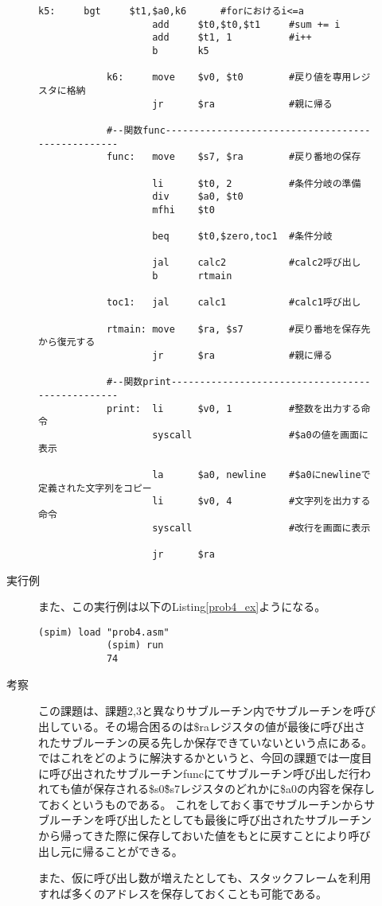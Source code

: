 \documentclass{jsarticle}
\begin{document}
\begin{description}
\begin{description}
\begin{lstlisting}[caption=課題4のソースコード, label=prob4]
            k5:     bgt     $t1,$a0,k6      #forにおけるi<=a
                    add     $t0,$t0,$t1     #sum += i
                    add     $t1, 1          #i++
                    b       k5

            k6:     move    $v0, $t0        #戻り値を専用レジスタに格納
                    jr      $ra             #親に帰る

            #--関数func--------------------------------------------------
            func:   move    $s7, $ra        #戻り番地の保存

                    li      $t0, 2          #条件分岐の準備
                    div     $a0, $t0
                    mfhi    $t0

                    beq     $t0,$zero,toc1  #条件分岐

                    jal     calc2           #calc2呼び出し
                    b       rtmain

            toc1:   jal     calc1           #calc1呼び出し

            rtmain: move    $ra, $s7        #戻り番地を保存先から復元する
                    jr      $ra             #親に帰る

            #--関数print-------------------------------------------------
            print:  li      $v0, 1          #整数を出力する命令
                    syscall                 #$a0の値を画面に表示

                    la      $a0, newline    #$a0にnewlineで定義された文字列をコピー
                    li      $v0, 4          #文字列を出力する命令
                    syscall                 #改行を画面に表示

                    jr      $ra
            \end{lstlisting}

            \item[実行例]
            また、この実行例は以下のListing\ref{prob4_ex}ようになる。
            \begin{lstlisting}[caption=課題4の実行例, label=prob4_ex]
            (spim) load "prob4.asm"
            (spim) run
            74
            \end{lstlisting}

            \item[考察]
            この課題は、課題2,3と異なりサブルーチン内でサブルーチンを呼び出している。その場合困るのは\$raレジスタの値が最後に呼び出されたサブルーチンの戻る先しか保存できていないという点にある。
            ではこれをどのように解決するかというと、今回の課題では一度目に呼び出されたサブルーチンfuncにてサブルーチン呼び出しだ行われても値が保存される\$s0\~\$s7レジスタのどれかに\$a0の内容を保存しておくというものである。
            これをしておく事でサブルーチンからサブルーチンを呼び出したとしても最後に呼び出されたサブルーチンから帰ってきた際に保存しておいた値をもとに戻すことにより呼び出し元に帰ることができる。

            また、仮に呼び出し数が増えたとしても、スタックフレームを利用すれば多くのアドレスを保存しておくことも可能である。
        \end{description}
    \end{description}
\end{document}
